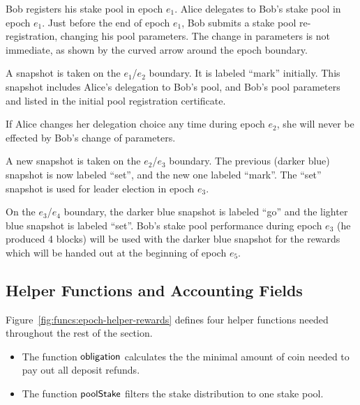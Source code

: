 
Bob registers his stake pool in epoch $e_1$.
Alice delegates to Bob's stake pool in epoch $e_1$.
Just before the end of epoch $e_1$, Bob submits a stake pool re-registration,
changing his pool parameters. The change in parameters is not immediate,
as shown by the curved arrow around the epoch boundary.

A snapshot is taken on the $e_1$/$e_2$ boundary. It is labeled ``mark'' initially.
This snapshot includes Alice's delegation to Bob's pool, and Bob's pool parameters
and listed in the initial pool registration certificate.

If Alice changes her delegation choice any time during epoch $e_2$,
she will never be effected by Bob's change of parameters.

A new snapshot is taken on the $e_2$/$e_3$ boundary.
The previous (darker blue) snapshot is now labeled ``set'', and the new one labeled ``mark''.
The ``set'' snapshot is used for leader election in epoch $e_3$.

On the $e_3$/$e_4$ boundary, the darker blue snapshot is labeled ``go'' and
the lighter blue snapshot is labeled ``set''.
Bob's stake pool performance during epoch $e_3$ (he produced 4 blocks)
will be used with the darker blue snapshot for the rewards which will
be handed out at the beginning of epoch $e_5$.

\subsection{Helper Functions and Accounting Fields}
\label{sec:stake-dist-helpers}

Figure~\ref{fig:funcs:epoch-helper-rewards} defines four helper functions needed
throughout the rest of the section.

\begin{itemize}
  \item The function $\mathsf{obligation}$ calculates the the minimal amount of coin needed to
    pay out all deposit refunds.
  \item The function $\mathsf{poolStake}$ filters the stake distribution to one stake pool.
\end{itemize}


